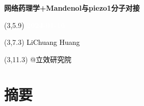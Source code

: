 \documentclass[
]{article}
\author{}
\date{\vspace{-2.5em}}
\begin{document}
\begin{titlepage} 
\begin{center} \textbf{\Huge
网络药理学+Mandenol与piezo1分子对接} \vspace{4em}
\begin{textblock}{10}(3,5.9) \huge
\textbf{\textcolor{white}{2024-01-16}}
\end{textblock} \begin{textblock}{10}(3,7.3)
\Large \textcolor{black}{LiChuang Huang}
\end{textblock} \begin{textblock}{10}(3,11.3)
\Large \textcolor{black}{@立效研究院}
\end{textblock} \end{center} \end{titlepage}
\restoregeometry


\tableofcontents

\listoffigures

\listoftables

\newpage


\hypertarget{abstract}{%
\section{摘要}\label{abstract}}
\end{document}
